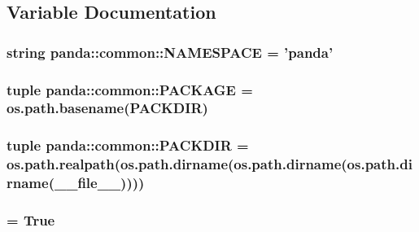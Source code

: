 \subsection{Variable Documentation}
\hypertarget{namespacepanda_1_1common_aea052ff12707bd23356da7a2b5e4a653}{
\subsubsection[{NAMESPACE}]{\setlength{\rightskip}{0pt plus 5cm}string {\bf panda::common::NAMESPACE} = 'panda'}}
\label{namespacepanda_1_1common_aea052ff12707bd23356da7a2b5e4a653}
\hypertarget{namespacepanda_1_1common_a4143d30df292ff8e51f53f36d3dd2def}{
\subsubsection[{PACKAGE}]{\setlength{\rightskip}{0pt plus 5cm}tuple {\bf panda::common::PACKAGE} = os.path.basename({\bf PACKDIR})}}
\label{namespacepanda_1_1common_a4143d30df292ff8e51f53f36d3dd2def}
\hypertarget{namespacepanda_1_1common_ab6475a34a0c73648191a04e503c41811}{
\subsubsection[{PACKDIR}]{\setlength{\rightskip}{0pt plus 5cm}tuple {\bf panda::common::PACKDIR} = os.path.realpath(os.path.dirname(os.path.dirname(os.path.dirname(\_\-\_\-file\_\-\_\-))))}}
\label{namespacepanda_1_1common_ab6475a34a0c73648191a04e503c41811}
\hypertarget{namespacepanda_1_1common_afda67b2d5acec08a86a3d95d06374744}{
\subsubsection[{PRESERVE\_\-CUSTOM}]{ = True}}
\label{namespacepanda_1_1common_afda67b2d5acec08a86a3d95d06374744}
